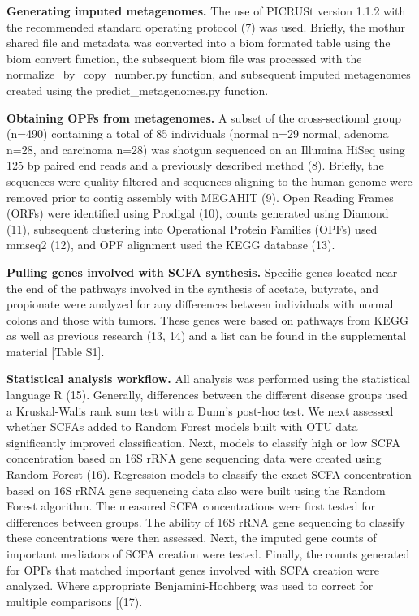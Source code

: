 \documentclass[11pt,]{article}
\begin{document}
\textbf{Generating imputed metagenomes.} The use of PICRUSt version
1.1.2 with the recommended standard operating protocol (7) was used.
Briefly, the mothur shared file and metadata was converted into a biom
formated table using the biom convert function, the subsequent biom file
was processed with the normalize\_by\_copy\_number.py function, and
subsequent imputed metagenomes created using the predict\_metagenomes.py
function.

\textbf{Obtaining OPFs from metagenomes.} A subset of the
cross-sectional group (n=490) containing a total of 85 individuals
(normal n=29 normal, adenoma n=28, and carcinoma n=28) was shotgun
sequenced on an Illumina HiSeq using 125 bp paired end reads and a
previously described method (8). Briefly, the sequences were quality
filtered and sequences aligning to the human genome were removed prior
to contig assembly with MEGAHIT (9). Open Reading Frames (ORFs) were
identified using Prodigal (10), counts generated using Diamond (11),
subsequent clustering into Operational Protein Families (OPFs) used
mmseq2 (12), and OPF alignment used the KEGG database (13).

\textbf{Pulling genes involved with SCFA synthesis.} Specific genes
located near the end of the pathways involved in the synthesis of
acetate, butyrate, and propionate were analyzed for any differences
between individuals with normal colons and those with tumors. These
genes were based on pathways from KEGG as well as previous research (13,
14) and a list can be found in the supplemental material {[}Table S1{]}.

\textbf{Statistical analysis workflow.} All analysis was performed using
the statistical language R (15). Generally, differences between the
different disease groups used a Kruskal-Walis rank sum test with a
Dunn's post-hoc test. We next assessed whether SCFAs added to Random
Forest models built with OTU data significantly improved classification.
Next, models to classify high or low SCFA concentration based on 16S
rRNA gene sequencing data were created using Random Forest (16).
Regression models to classify the exact SCFA concentration based on 16S
rRNA gene sequencing data also were built using the Random Forest
algorithm. The measured SCFA concentrations were first tested for
differences between groups. The ability of 16S rRNA gene sequencing to
classify these concentrations were then assessed. Next, the imputed gene
counts of important mediators of SCFA creation were tested. Finally, the
counts generated for OPFs that matched important genes involved with
SCFA creation were analyzed. Where appropriate Benjamini-Hochberg was
used to correct for multiple comparisons {[}(17).
\end{document}
